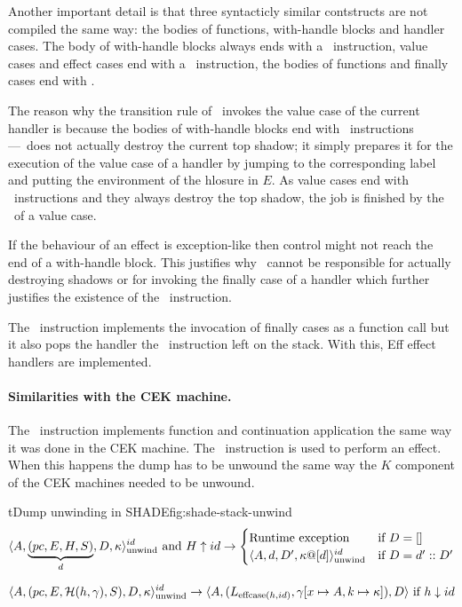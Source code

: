 \documentclass[class=article, crop=false]{standalone}
\begin{document}
Another important detail is that three syntacticly similar contstructs are not
compiled the same way: the bodies of functions, with-handle blocks and handler
cases.
The body of with-handle blocks
always ends with a \vmKillShadow\  instruction, value cases and effect cases end
with a \vmRett\ instruction, the bodies of functions and finally cases end with
\vmRet.

The reason why the transition rule of \vmKillShadow\ invokes the value case of
the current handler is because the bodies of with-handle blocks end with
\vmKillShadow\ instructions---\vmKillShadow\ does not actually destroy the
current top shadow; it simply prepares it for the execution of the value case
of a handler by jumping to the corresponding label and putting the environment
of the hlosure in $E$. As value cases end with \vmRett\ instructions and they
always destroy the top shadow, the job is finished by the \vmRett\ of a value
case.

If the behaviour of an effect is exception-like then control might not reach
the end of a with-handle block. This justifies why \vmKillShadow\ cannot be
responsible for actually destroying shadows or for invoking the finally case of
a handler which further justifies the existence of the \vmFin\ instruction.

The \vmFin\ instruction implements the invocation of finally cases as a
function call but it also pops the handler the \vmCastShadow\ instruction left
on the stack. With this, Eff effect handlers are implemented.

\paragraph{Similarities with the CEK machine.}
The \vmApply\ instruction implements function and continuation application the
same way it was done in the CEK machine. The \vmThrow\ instruction is used to
perform an effect. When this happens the dump has to be unwound the same way
the $K$ component of the CEK machines needed to be unwound.

\begin{myfigure}[1]{t}{Dump unwinding in SHADE}{fig:shade-stack-unwind}
    $$ \langle A, \underbrace{(pc, E, H, S)}_d, D, \kappa  \rangle_\text{unwind}^{id} \text{ and } H \uparrow id \to \begin{cases}
        \text{Runtime exception} & \text{if } D = [] \\
    \langle A, d, D', \kappa @ [d] \rangle_\text{unwind}^{id} & \text{if } D = d' :: D' \end{cases} $$

    $$ \langle A, (pc, E, \mathcal{H}(h, \gamma), S), D, \kappa \rangle_\text{unwind}^{id} \to
        \langle A, (L_{\text{effcase}(h, id)}, \gamma[x \mapsto A, k \mapsto \kappa] ), D \rangle \text{ if } h \downarrow id $$
\end{myfigure}
\end{document}
